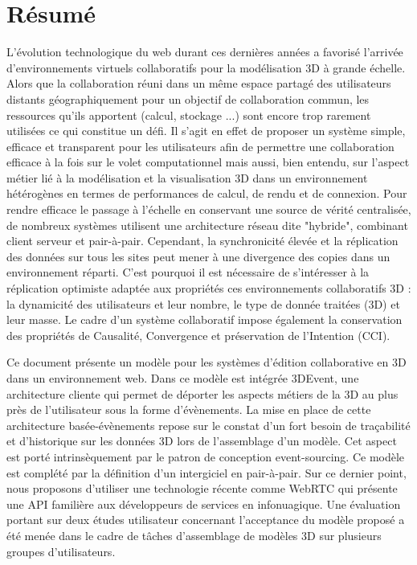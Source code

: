 \clearpage
{}
\adjustmtc
\section*{Résumé}

L’évolution technologique du web durant ces dernières années a favorisé l’arrivée d’environnements virtuels collaboratifs pour la modélisation 3D à grande échelle. Alors que la collaboration réuni dans un même espace partagé des utilisateurs distants géographiquement pour un objectif de collaboration commun, les ressources qu'ils apportent (calcul, stockage ...) sont encore trop rarement utilisées ce qui constitue un défi. Il s'agit en effet de proposer un système simple, efficace et transparent pour les utilisateurs afin de permettre une collaboration efficace à la fois sur le volet computationnel mais aussi, bien entendu, sur l'aspect métier lié à la modélisation et la visualisation 3D dans un environnement hétérogènes en termes de performances de calcul, de rendu et de connexion.
Pour rendre efficace le passage à l’échelle en conservant une source de vérité centralisée, de nombreux systèmes utilisent une architecture réseau dite "hybride", combinant client serveur et pair-à-pair. Cependant, la synchronicité élevée et la réplication des données sur tous les sites peut mener à une divergence des copies dans un environnement réparti. C’est pourquoi il est nécessaire de s’intéresser à la réplication optimiste adaptée aux propriétés ces environnements collaboratifs 3D : la dynamicité des utilisateurs et leur nombre, le type de donnée traitées (3D) et leur masse. Le cadre d’un système collaboratif impose également la conservation des propriétés de Causalité, Convergence et préservation de l’Intention (CCI).

Ce document présente un modèle pour les systèmes d’édition collaborative en 3D dans un environnement web. Dans ce modèle est intégrée 3DEvent, une architecture cliente qui permet de déporter les aspects métiers de la 3D au plus près de l’utilisateur sous la forme d’évènements. La mise en place de cette architecture basée-évènements repose sur le constat d’un fort besoin de traçabilité et d’historique sur les données 3D lors de l’assemblage d’un modèle. Cet aspect est porté intrinsèquement par le patron de conception event-sourcing. Ce modèle est complété par la définition d’un intergiciel en pair-à-pair. Sur ce dernier point, nous proposons d'utiliser une technologie récente comme WebRTC qui présente une API familière aux développeurs de services en infonuagique. Une évaluation portant sur deux études utilisateur concernant l’acceptance du modèle proposé a été menée dans le cadre de tâches d’assemblage de modèles 3D sur plusieurs groupes d’utilisateurs.

